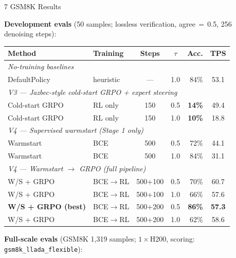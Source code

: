 \documentclass[final]{beamer}
\newlength{\colsep}   \setlength{\colsep}{0.7cm}
\newlength{\colwidth} \setlength{\colwidth}{0.306\paperwidth}
\begin{document}
\begin{frame}[t]
\begin{columns}[t]
\begin{column}{\colwidth}
\begin{block}{7 \quad GSM8K Results}

\textbf{Development evals} (50 samples; lossless verification,
agree$\,{=}\,$0.5, 256 denoising steps):

\vspace{0.35cm}
\begin{center}
\setlength{\tabcolsep}{5pt}
\renewcommand{\arraystretch}{1.4}
\begin{tabular}{llccrc}
\toprule
\textbf{Method} & \textbf{Training} & \textbf{Steps} & $\tau$ &
  \textbf{Acc.} & \textbf{TPS} \\
\midrule
\multicolumn{6}{l}{\small\textit{No-training baselines}} \\
\quad DefaultPolicy & heuristic & — & 1.0 & 84\% & 53.1 \\
\midrule
\multicolumn{6}{l}{\small\textit{V3 — Jazbec-style cold-start GRPO + expert steering}} \\
\quad Cold-start GRPO & RL only & 150 & 0.5 &
  \textcolor{accentred}{\textbf{14\%}} & 49.4 \\
\quad Cold-start GRPO & RL only & 150 & 1.0 &
  \textcolor{accentred}{\textbf{10\%}} & 18.8 \\
\midrule
\multicolumn{6}{l}{\small\textit{V4 — Supervised warmstart (Stage 1 only)}} \\
\quad Warmstart & BCE & 500 & 0.5 & 72\% & 44.1 \\
\quad Warmstart & BCE & 500 & 1.0 & 84\% & 31.1 \\
\midrule
\multicolumn{6}{l}{\small\textit{V4 — Warmstart $\to$ GRPO (full pipeline)}} \\
\quad W/S + GRPO & BCE$\to$RL & 500+100 & 0.5 & 70\% & 60.7 \\
\quad W/S + GRPO & BCE$\to$RL & 500+100 & 1.0 & 66\% & 57.6 \\
\rowcolor{highlightyellow}
\quad \textbf{W/S + GRPO (best)} & BCE$\to$RL & 500+200 & 0.5 &
  \textbf{86\%} & \textbf{57.3} \\
\quad W/S + GRPO & BCE$\to$RL & 500+200 & 1.0 & 62\% & 58.6 \\
\bottomrule
\end{tabular}
\end{center}

\vspace{0.5cm}
\textbf{Full-scale evals} (GSM8K 1{,}319 samples; $1{\times}$H200,
scoring: \texttt{gsm8k\_llada\_flexible}):


\end{block}
\end{column}
\end{columns}
\end{frame}
\end{document}

